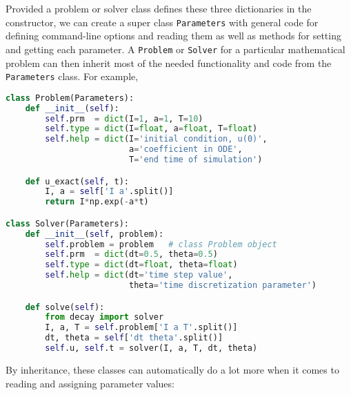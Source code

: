 \documentclass[graybox,sectrefs,envcountresetchap,open=right,final]{svmonodo}
\begin{document}
Provided a problem or solver class defines these three
dictionaries in the constructor,
we can create a super class \texttt{Parameters} with general code
for defining command-line options and reading them as well as
methods for setting and getting each parameter. A \texttt{Problem} or \texttt{Solver} for
a particular mathematical problem can then
inherit most of the needed functionality and code
from the \texttt{Parameters} class. For example,



























\begin{lstlisting}[language=python,style=blue1_bluegreen]
class Problem(Parameters):
    def __init__(self):
        self.prm  = dict(I=1, a=1, T=10)
        self.type = dict(I=float, a=float, T=float)
        self.help = dict(I='initial condition, u(0)',
                         a='coefficient in ODE',
                         T='end time of simulation')

    def u_exact(self, t):
        I, a = self['I a'.split()]
        return I*np.exp(-a*t)

class Solver(Parameters):
    def __init__(self, problem):
        self.problem = problem   # class Problem object
        self.prm  = dict(dt=0.5, theta=0.5)
        self.type = dict(dt=float, theta=float)
        self.help = dict(dt='time step value',
                         theta='time discretization parameter')

    def solve(self):
        from decay import solver
        I, a, T = self.problem['I a T'.split()]
        dt, theta = self['dt theta'.split()]
        self.u, self.t = solver(I, a, T, dt, theta)

\end{lstlisting}

By inheritance, these classes can automatically do a lot more when it comes to
reading and assigning parameter values:
\end{document}
